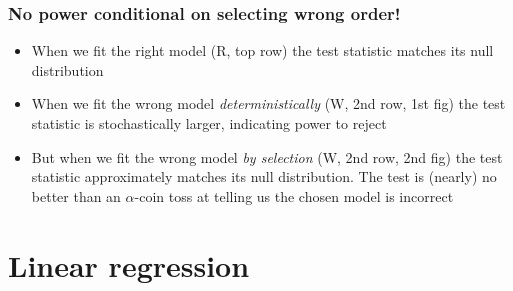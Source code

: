\documentclass{beamer}
\begin{document}

\begin{frame}
\frametitle{No power conditional on selecting wrong order!}


\begin{itemize}
\item When we fit the right model (R, top row) the test statistic matches its null distribution
\item When we fit the wrong model \textit{deterministically} (W, 2nd row, 1st fig) the test statistic is stochastically larger, indicating power to reject
\item But when we fit the wrong model \textit{by selection} (W, 2nd row, 2nd fig) the test statistic approximately matches its null distribution. The test is (nearly) no better than an $\alpha$-coin toss at telling us the chosen model is incorrect
\end{itemize}
\end{frame}




\section{Linear regression}
\end{document}
